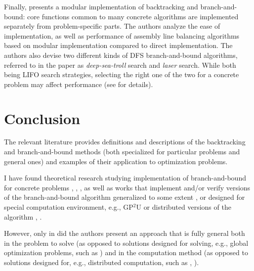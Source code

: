 Finally, \cite{johnson1988modular} presents a modular implementation of backtracking and
branch-and-bound: core functions common to many concrete algorithms are implemented separately
from problem-specific parts. The authors analyze the ease of implementation, as well as performance
of assembly line balancing algorithms based on modular implementation compared to direct
implementation. The authors also devise two different kinds of DFS branch-and-bound algorithms,
referred to in the paper as \emph{deep-sea-troll} search and \emph{laser} search. While both
being LIFO search strategies, selecting the right one of the two for a concrete  problem may
affect performance (see \cite{johnson1988modular} for details).

\section{Conclusion}

The relevant literature provides definitions and descriptions of the backtracking and
branch-and-bound methods (both specialized for particular problems and general ones) and
examples of their application to optimization problems.

I have found theoretical research studying implementation
of branch-and-bound for concrete problems
\cite{clausen1999principles}, \cite{bard1990bilevel}, \cite{indriyono2024sudoku},
as well as works that implement and/or verify versions of the branch-and-bound algorithm
generalized to some extent
\cite{narkawicz2013formalnasa}, \cite{johnson1988modular}
or designed for special computation environment, e.g., GP$^2$U \cite{lalami2012gpu} or
distributed versions of the algorithm \cite{finkel1987distrib}, \cite{smirnov2017concur}.

However, only in \cite{johnson1988modular} did the authors present an approach that is fully
general both in the problem to solve (as opposed to solutions designed for solving, e.g., global
optimization problems, such as \cite{narkawicz2013formalnasa}) and in the computation method
(as opposed to solutions designed for, e.g., distributed computation, such as
\cite{finkel1987distrib}, \cite{smirnov2017concur}).

